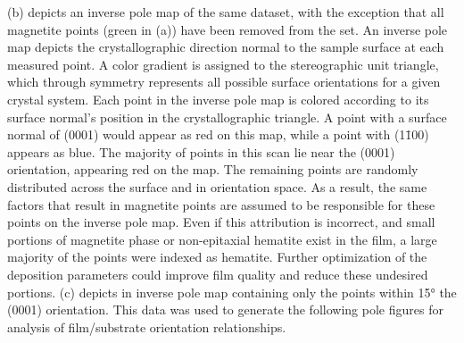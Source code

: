 (b) depicts an inverse pole map of the same dataset, with the exception that all magnetite points (green in (a)) have been removed from the set. An inverse pole map depicts the crystallographic direction normal to the sample surface at each measured point. A color gradient is assigned to the stereographic unit triangle, which through symmetry represents all possible surface orientations for a given crystal system. Each point in the inverse pole map is colored according to its surface normal's position in the crystallographic triangle. A point with a surface normal of (0001) would appear as red on this map, while a point with (1\={1}00) appears as blue. The majority of points in this scan lie near the (0001) orientation, appearing red on the map. The remaining points are randomly distributed across the surface and in orientation space. As a result, the same factors that result in magnetite points are assumed to be responsible for these points on the inverse pole map. Even if this attribution is incorrect, and small portions of magnetite phase or non-epitaxial hematite exist in the film, a large majority of the points were indexed as hematite. Further optimization of the deposition parameters could improve film quality and reduce these undesired portions. (c) depicts in inverse pole map containing only the points within 15\si{\degree} the (0001) orientation. This data was used to generate the following pole figures for analysis of film/substrate orientation relationships.

